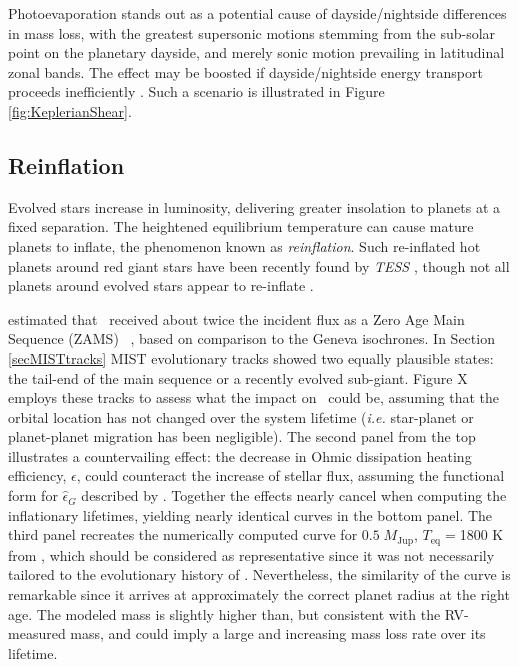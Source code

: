 \documentclass[twocolumn]{aastex631}
\newcommand{\hatp}{\object{HAT-P-67}~}
\newcommand{\hatpb}{\object{HAT-P-67 b}}
\begin{document}
Photoevaporation stands out as a potential cause of dayside/nightside differences in mass loss, with the greatest supersonic motions stemming from the sub-solar point on the planetary dayside, and merely sonic motion prevailing in latitudinal zonal bands.  The effect may be boosted if dayside/nightside energy transport proceeds inefficiently \citep{2009ApJ...693...23M}.  Such a scenario is illustrated in Figure \ref{fig:KeplerianShear}.

\subsection{Reinflation}
Evolved stars increase in luminosity, delivering greater insolation to planets at a fixed separation.  The heightened equilibrium temperature can cause mature planets to inflate, the phenomenon known as \emph{reinflation}.  Such re-inflated hot planets around red giant stars have been recently found by \emph{TESS} \citep{2022AJ....163..120G,2023arXiv230306728G}, though not all planets around evolved stars appear to re-inflate \citep{2022AJ....163...53S}.

\citet{2017AJ....153..211Z} estimated that \hatpb~received about twice the incident flux as a Zero Age Main Sequence (ZAMS) \hatp, based on comparison to the Geneva isochrones. In Section \ref{secMISTtracks} MIST evolutionary tracks showed two equally plausible states: the tail-end of the main sequence or a recently evolved sub-giant.  Figure X employs these tracks to assess what the impact on \hatpb~could be, assuming that the orbital location has not changed over the system lifetime (\emph{i.e.} star-planet or planet-planet migration has been negligible).  The second panel from the top illustrates a countervailing effect: the decrease in Ohmic dissipation heating efficiency, $\epsilon$, could counteract the increase of stellar flux, assuming the functional form for $\hat{\epsilon}_G$ described by \citet{2018AJ....155..214T}.  Together the effects nearly cancel when computing the inflationary lifetimes, yielding nearly identical curves in the bottom panel.  The third panel recreates the numerically computed curve for $0.5\;M_\mathrm{Jup}$, $T_\mathrm{eq}=$1800 K from \citep{2011ApJ...738....1B}, which should be considered as representative since it was not necessarily tailored to the evolutionary history of \hatpb.  Nevertheless, the similarity of the curve is remarkable since it arrives at approximately the correct planet radius at the right age.  The modeled mass is slightly higher than, but consistent with the RV-measured mass, and could imply a large and increasing mass loss rate over its lifetime.
\end{document}
